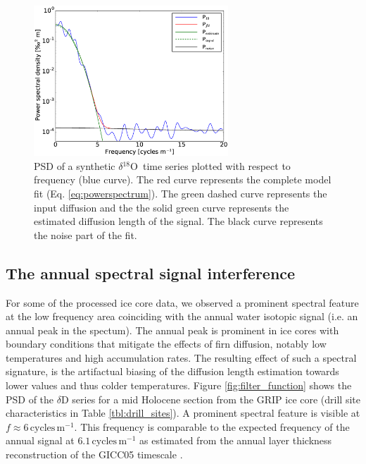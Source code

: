 \documentclass[11pt, draftcls, onecolumn]{IEEEtran} %
\numberwithin{equation}{section}
\numberwithin{table}{section}
\numberwithin{figure}{section}
\newcommand{\delOx}{$\delta{}^{18}\mathrm{O}$}
\begin{document}
\begin{figure}[]	
	\vspace*{2mm}	
	\begin{center}		
		\includegraphics[width=0.65\textwidth]{Figure_4}		
		\caption{PSD of a synthetic \delOx~time series plotted with respect to frequency (blue curve).
				The red curve represents the complete model fit (Eq. \ref{eq:powerspectrum}).
				The green dashed curve represents the input diffusion 
				and the the solid green curve represents the estimated diffusion length
				of the signal. The black curve represents the noise part of the fit.}
		\label{fig:synthetic_power_spectra}	
	\end{center}
\end{figure}

\subsection*{The annual spectral signal interference}
For some of the processed ice core data, we observed a prominent spectral feature 
at the low frequency area coinciding with the annual water isotopic signal
(i.e. an annual peak in the spectum).
The annual peak is prominent in ice cores with boundary conditions that mitigate the effects
of firn diffusion, notably low temperatures and high accumulation rates.
The resulting effect of such a spectral signature, is the artifactual biasing of the diffusion length estimation 
towards lower values and thus colder temperatures.
Figure \ref{fig:filter_function} shows the PSD of the $\delta$D series for a mid Holocene section from the GRIP ice core
(drill site characteristics in Table \ref{tbl:drill_sites}). 
A prominent spectral feature  is visible at  $f\approx6 \,\mathrm{cycles\,m^{-1}}$. This frequency is comparable to the 
expected frequency of the annual signal at $6.1\,\mathrm{cycles\,m^{-1}}$ as estimated from the annual layer thickness reconstruction 
of the GICC05 timescale \citep{Vinther2006}.
\end{document}
